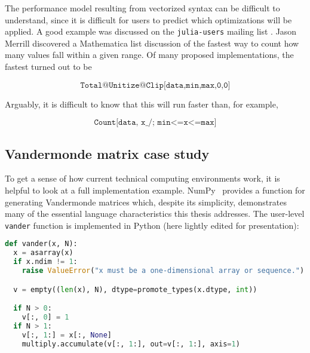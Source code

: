 {The performance model resulting from vectorized syntax can be difficult to
understand, since it is difficult for users to predict which optimizations
will be applied.
A good example was discussed on the \texttt{julia-users} mailing list \cite{jasonmerrill}.
Jason Merrill discovered a Mathematica \cite{mathematica} list discussion
of the fastest way to count how many values fall within a given range.
Of many proposed implementations, the fastest turned out to be

\vspace{-3ex}

\[ \texttt{Total@Unitize@Clip[data,{min,max},{0,0}]} \]

\noindent
Arguably, it is difficult to know that this will run faster than, for
example,

\vspace{-3ex}

\[ \texttt{Count[data,~x\_/;~min<=x<=max]} \]


\subsection{Vandermonde matrix case study}

To get a sense of how current technical computing environments work,
it is helpful to look at a full implementation example.
NumPy~\cite{numpy} provides a function for generating Vandermonde matrices
which, despite its simplicity, demonstrates many of the essential language
characteristics this thesis addresses.
The user-level \texttt{vander} function is implemented in Python (here
lightly edited for presentation):

\begin{singlespace}
\begin{lstlisting}[language=python,style=ttcode]
def vander(x, N):
  x = asarray(x)
  if x.ndim != 1:
    raise ValueError("x must be a one-dimensional array or sequence.")

  v = empty((len(x), N), dtype=promote_types(x.dtype, int))

  if N > 0:
    v[:, 0] = 1
  if N > 1:
    v[:, 1:] = x[:, None]
    multiply.accumulate(v[:, 1:], out=v[:, 1:], axis=1)


\end{lstlisting}
\end{singlespace}}
